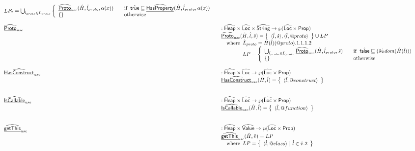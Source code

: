 \[\begin{array}{ll}
{  LP_2 = \bigcup_{\hat{l}_{proto}\in\hat{L}_{proto}}\left\{
    \begin{array}{ll}
      \ahf{Proto}_{\it use}(\hat{H},\hat{l}_{proto},\alpha(x))&\quad\ifc{\atrue\sqsubseteq\ahf{HasProperty}(\hat{H},\hat{l}_{proto},\alpha(x))}\\
      \set{} &\quad\owc
    \end{array}
  \right.
}
\\\\
\ahf{Proto}_{\it use} & : \aHeap \times \aLoc \times \abs{String} \rightarrow \powerset{\aLoc \times \SF{Prop}}\\
& \ahf{Proto}_{\it use}(\hat{H},\hat{l},\hat{s}) = \set{\langle\hat{l},\hat{s}\rangle,\langle\hat{l},\varprop{proto}\rangle}\cup LP\\
&\quad\wherec{
  \hat{L}_{proto} = \hat{H}(\hat{l})(\varprop{proto}).1.1.1.2\\
  LP=\left\{
    \begin{array}{ll}
      \bigcup_{\hat{l}_{proto}\in\hat{L}_{proto}}\ahf{Proto}_{\it use}(\hat{H},\hat{l}_{proto},\hat{s})&\quad\ifc{\afalse\sqsubseteq (\hat{s}\dot{\in}dom(\hat{H}(\hat{l})))}\\
      \set{}&\quad\owc
    \end{array}
  \right.\\
}
\\\\
\ahf{HasConstruct}_{\it use} & : \aHeap \times \aLoc \rightarrow \powerset{\aLoc \times \SF{Prop}}\\
& \ahf{HasConstruct}_{\it use}(\hat{H},\hat{l}) = \set{\langle\hat{l},\varprop{construct}\rangle}\\
\\\\
\ahf{IsCallable}_{\it use} & : \aHeap \times \aLoc \rightarrow \powerset{\aLoc \times \SF{Prop}}\\
& \ahf{IsCallable}_{\it use}(\hat{H},\hat{l}) = \set{\langle\hat{l},\varprop{function}\rangle}\\
\\\\
\ahf{getThis}_{\it use} & : \aHeap \times \aValue \rightarrow \powerset{\aLoc \times \SF{Prop}}\\
& \ahf{getThis}_{\it use}(\hat{H},\hat{v}) = LP\\
& \quad\wherec{
  LP = \set{\langle \hat{l}, \varprop{class}\rangle ~|~ \hat{l} \in \hat{v}.2}\\
}
\\\\

\end{array}\]
